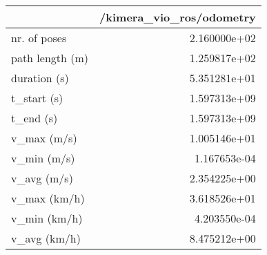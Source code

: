 \begin{tabular}{lr}
\toprule
{} &  /kimera\_vio\_ros/odometry \\
\midrule
nr. of poses    &              2.160000e+02 \\
path length (m) &              1.259817e+02 \\
duration (s)    &              5.351281e+01 \\
t\_start (s)     &              1.597313e+09 \\
t\_end (s)       &              1.597313e+09 \\
v\_max (m/s)     &              1.005146e+01 \\
v\_min (m/s)     &              1.167653e-04 \\
v\_avg (m/s)     &              2.354225e+00 \\
v\_max (km/h)    &              3.618526e+01 \\
v\_min (km/h)    &              4.203550e-04 \\
v\_avg (km/h)    &              8.475212e+00 \\
\bottomrule
\end{tabular}
